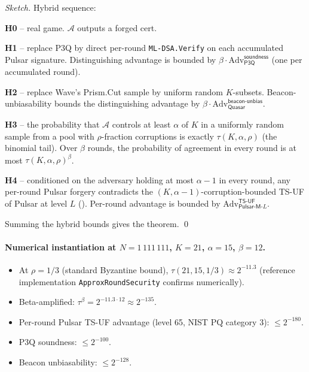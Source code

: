 \begin{proof}[Sketch]
Hybrid sequence:

\textbf{H0} -- real game. $\mathcal{A}$ outputs a forged cert.

\textbf{H1} -- replace P3Q by direct per-round
\texttt{ML-DSA.Verify} on each accumulated Pulsar signature.
Distinguishing advantage is bounded by
$\beta \cdot \mathrm{Adv}^{\mathsf{soundness}}_{\mathsf{P3Q}}$ (one
per accumulated round).

\textbf{H2} -- replace Wave's Prism.Cut sample by uniform random
$K$-subsets. Beacon-unbiasability bounds the distinguishing advantage
by $\beta \cdot \mathrm{Adv}^{\mathsf{beacon\text{-}unbias}}_{\mathsf{Quasar}}$.

\textbf{H3} -- the probability that $\mathcal{A}$ controls at least
$\alpha$ of $K$ in a uniformly random sample from a pool with
$\rho$-fraction corruptions is exactly $\tau(K, \alpha, \rho)$ (the
binomial tail). Over $\beta$ rounds, the probability of agreement
in every round is at most $\tau(K, \alpha, \rho)^\beta$.

\textbf{H4} -- conditioned on the adversary holding at most
$\alpha - 1$ in every round, any per-round Pulsar forgery
contradicts the $(K, \alpha-1)$-corruption-bounded TS-UF of
Pulsar at level $L$ (). Per-round
advantage is bounded by
$\mathrm{Adv}^{\mathsf{TS\text{-}UF}}_{\mathsf{Pulsar\text{-}M}\text{-}L}$.

Summing the hybrid bounds gives the theorem. \qed
\end{proof}

\paragraph{Numerical instantiation at $N = 1\,111\,111$, $K = 21$,
$\alpha = 15$, $\beta = 12$.}

\begin{itemize}[leftmargin=*, itemsep=0pt]
\item At $\rho = 1/3$ (standard Byzantine bound),
$\tau(21, 15, 1/3) \approx 2^{-11.3}$ (reference implementation
\texttt{ApproxRoundSecurity} confirms numerically).
\item Beta-amplified: $\tau^{\beta} = 2^{-11.3 \cdot 12} \approx 2^{-135}$.
\item Per-round Pulsar TS-UF advantage (level 65, NIST PQ
category 3): $\le 2^{-180}$.
\item P3Q soundness: $\le 2^{-100}$.
\item Beacon unbiasability: $\le 2^{-128}$.
\end{itemize}


